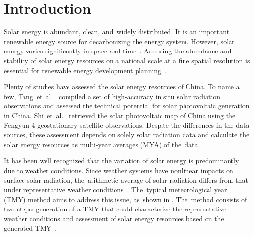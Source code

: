 \documentclass[atmosphere,article,accept,pdftex,moreauthors]{Definitions/mdpi}
\begin{document}
\section{Introduction}\label{sec:intro}

Solar energy is abundant, clean, and~widely distributed. It is an important renewable energy source for decarbonizing the energy system. However, solar energy varies significantly in space and time~\cite{wang2015JGRA, he2020GRLa, shaner2018EES}. Assessing the abundance and stability of solar energy resources on a national scale at a fine spatial resolution is essential for renewable energy development planning~\cite{shaner2018EES, tong2021NC}.

Plenty of studies have assessed the solar energy resources of China. To name a few, Tang~et~al.~\cite{tang2023JCP} compiled a set of high-accuracy in situ solar radiation observations and assessed the technical potential for solar photovoltaic generation in China. Shi~et~al.~\cite{shi2023RSER} retrieved the solar photovoltaic map of China using the Fengyun-4 geostationary satellite observations. Despite the differences in the data sources, these assessment depends on solely solar radiation data and calculate the solar energy resources as multi-year averages (MYA) of the~data.

It has been well recognized that the variation of solar energy is predominantly due to weather conditions. Since weather systems have nonlinear impacts on surface solar radiation, the~arithmetic average of solar radiation differs from that under representative weather conditions~\cite{abreu2018RE}. The~typical meteorological year (TMY) method aims to address this issue, as~shown in . The~method consists of two steps: generation of a TMY that could characterize the representative weather conditions and assessment of solar energy resources based on the generated TMY~\cite{li2020E, abreu2018RE, chang2017PM, jiang2010E, bulut2004RE, kambezidis2020TAC, markou2007AE, pissimanis1988SE}.
\end{document}
